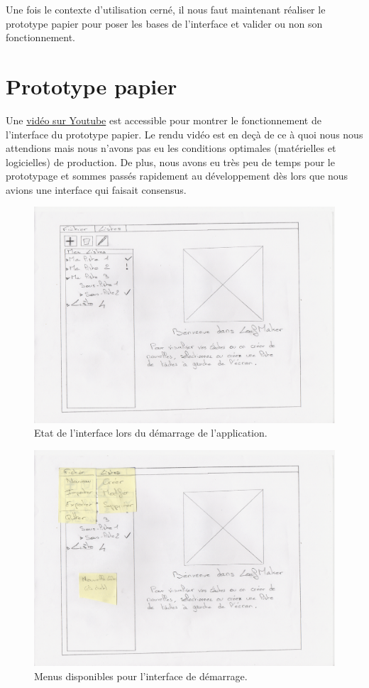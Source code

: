 		Une fois le contexte d'utilisation cerné, il nous faut maintenant réaliser le prototype papier pour poser les bases de l'interface et valider ou non son fonctionnement. 
	
	\section{Prototype papier}
	Une \href{https://www.youtube.com/watch?v=xbLaZvgkzjQ}{vidéo sur Youtube} est accessible pour montrer le fonctionnement de l'interface du prototype papier. Le rendu vidéo est en deçà de ce à quoi nous nous attendions mais nous n'avons pas eu les conditions optimales (matérielles et logicielles) de production. De plus, nous avons eu très peu de temps pour le prototypage et sommes passés rapidement au développement dès lors que nous avions une interface qui faisait consensus.
	
		\begin{figure}[h!]
			\centering
		   \includegraphics[scale=1.5]{img/pp_ihm_1.png}
		   \caption{Etat de l'interface lors du démarrage de l'application.}
		\end{figure}
		\FloatBarrier
	
		\begin{figure}[h!]
			\centering
		   \includegraphics[scale=1.5]{img/pp_ihm_2.png}
		   \caption{Menus disponibles pour l'interface de démarrage.}
		\end{figure}
		\FloatBarrier
	
